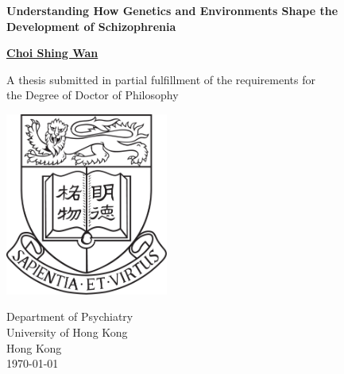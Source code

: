 \documentclass[12pt]{scrbook}
\begin{document}
\thispagestyle{empty}
\pagestyle{empty}

\begin{singlespace}
	\begin{titlepage}
		\begin{center}
			\vspace*{1cm}
			
			\Huge
			\textbf{Understanding How Genetics and Environments Shape the Development of Schizophrenia}
			
			\vspace{0.5cm}
			\LARGE
			
			\vspace{1.5cm}
			
			\textbf{\href{mailto:choishingwan@gmail.com}{Choi Shing Wan}}
			
			\vfill
			
			A thesis submitted in partial fulfillment of the requirements for \\
			the Degree of Doctor of Philosophy
			
			\vspace{0.8cm}
			
			\includegraphics[width=0.4\textwidth]{figure/hkuLogo.jpg}
			
			\Large
			Department of Psychiatry\\
			University of Hong Kong\\
			Hong Kong\\
			\today
			
		\end{center}
	\end{titlepage}
\end{singlespace}


\frontmatter 
	\cleardoublepage
\end{document}
